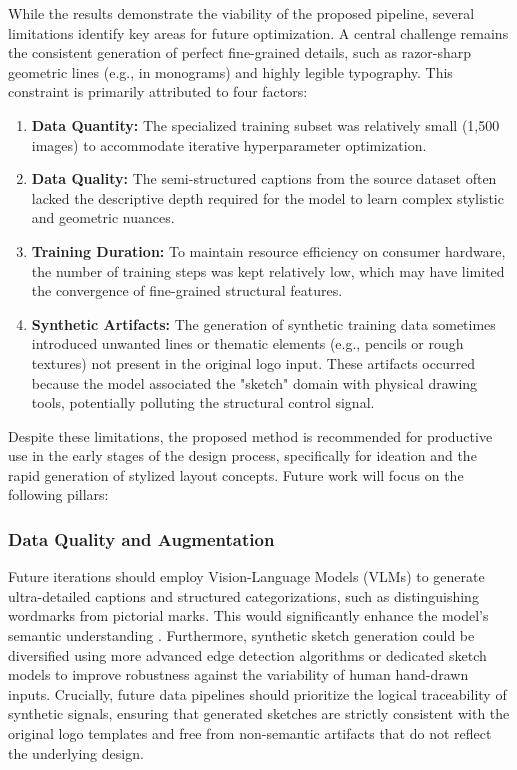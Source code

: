 While the results demonstrate the viability of the proposed pipeline, several limitations identify key areas for future optimization. A central challenge remains the consistent generation of perfect fine-grained details, such as razor-sharp geometric lines (e.g., in monograms) and highly legible typography. This constraint is primarily attributed to four factors:
\begin{enumerate}
    \item \textbf{Data Quantity:} The specialized training subset was relatively small (1,500 images) to accommodate iterative hyperparameter optimization.
    \item \textbf{Data Quality:} The semi-structured captions from the source dataset often lacked the descriptive depth required for the model to learn complex stylistic and geometric nuances.
    \item \textbf{Training Duration:} To maintain resource efficiency on consumer hardware, the number of training steps was kept relatively low, which may have limited the convergence of fine-grained structural features.
    \item \textbf{Synthetic Artifacts:} The generation of synthetic training data sometimes introduced unwanted lines or thematic elements (e.g., pencils or rough textures) not present in the original logo input. These artifacts occurred because the model associated the "sketch" domain with physical drawing tools, potentially polluting the structural control signal.
\end{enumerate}

Despite these limitations, the proposed method is recommended for productive use in the early stages of the design process, specifically for ideation and the rapid generation of stylized layout concepts. Future work will focus on the following pillars:

\subsubsection*{Data Quality and Augmentation}
Future iterations should employ Vision-Language Models (VLMs) to generate ultra-detailed captions and structured categorizations, such as distinguishing wordmarks from pictorial marks. This would significantly enhance the model's semantic understanding \cite{zeng-etal-2025-enhancing-large}. Furthermore, synthetic sketch generation could be diversified using more advanced edge detection algorithms or dedicated sketch models to improve robustness against the variability of human hand-drawn inputs. Crucially, future data pipelines should prioritize the logical traceability of synthetic signals, ensuring that generated sketches are strictly consistent with the original logo templates and free from non-semantic artifacts that do not reflect the underlying design.

